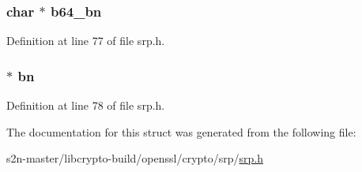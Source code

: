 \subsubsection[{\texorpdfstring{b64\+\_\+bn}{b64_bn}}]{\setlength{\rightskip}{0pt plus 5cm}char $\ast$ b64\+\_\+bn}\hypertarget{struct_s_r_p__g_n__cache__st_a6e0fc2098300505ba2325dffeffa87f4}{}\label{struct_s_r_p__g_n__cache__st_a6e0fc2098300505ba2325dffeffa87f4}


Definition at line 77 of file srp.\+h.

\subsubsection[{\texorpdfstring{bn}{bn}}]{ $\ast$ bn}\hypertarget{struct_s_r_p__g_n__cache__st_abfa3c2ad758c9f55e6324c3061540298}{}\label{struct_s_r_p__g_n__cache__st_abfa3c2ad758c9f55e6324c3061540298}


Definition at line 78 of file srp.\+h.



The documentation for this struct was generated from the following file\+:\begin{DoxyCompactItemize}
\item 
s2n-\/master/libcrypto-\/build/openssl/crypto/srp/\hyperlink{crypto_2srp_2srp_8h}{srp.\+h}\end{DoxyCompactItemize}

